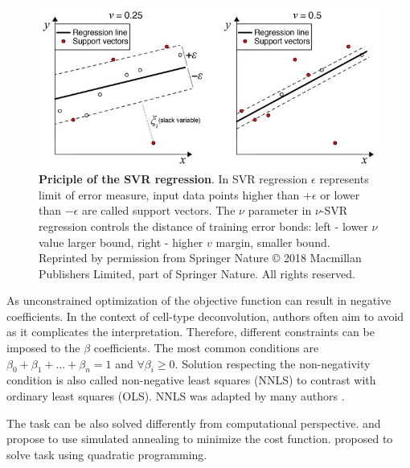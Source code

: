 \documentclass[12pt,]{book}
\theoremstyle{definition}
\theoremstyle{definition}
\theoremstyle{definition}
\theoremstyle{remark}
\begin{document}
\begin{figure}

{\centering \includegraphics[width=1\linewidth]{figures-ext/vSVR} 

}

\caption[Priciple of the SVR regression]{\textbf{Priciple of the SVR regression}. In SVR
regression \(\epsilon\) represents limit of error measure, input data
points higher than \(+\epsilon\) or lower than \(-\epsilon\) are called
support vectors. The \(\nu\) parameter in \(\nu\)-SVR regression
controls the distance of training error bonds: left - lower \(\nu\)
value larger bound, right - higher \(v\) margin, smaller bound.
Reprinted by permission from Springer Nature \citep{Newman2015} © 2018
Macmillan Publishers Limited, part of Springer Nature. All rights
reserved.}\label{fig:svr}
\end{figure}











As unconstrained optimization of the objective function can result in
negative coefficients. In the context of cell-type deconvolution,
authors often aim to avoid as it complicates the interpretation.
Therefore, different constraints can be imposed to the \(\beta\)
coefficients. The most common conditions are
\(\beta_0 +\beta_1+ ...+\beta_n =1\) and \(\forall\beta_i \geq 0\).
Solution respecting the non-negativity condition is also called
non-negative least squares (NNLS) to contrast with ordinary least
squares (OLS). NNLS was adapted by many authors
\citep{Venet2001, Abbas2009, Repsilber2010, Zuckerman2013, Wang2016}.

The task can be also solved differently from computational perspective.
\citet{Lu2003} and \citet{Wang2006} propose to use simulated annealing
to minimize the cost function. \citet{Gong2011} proposed to solve task
using quadratic programming.
\end{document}
